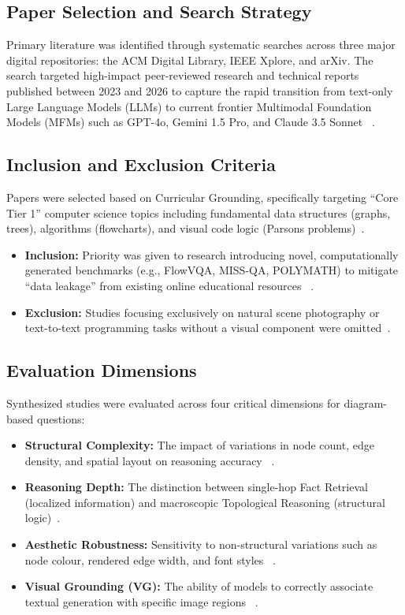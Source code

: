 \documentclass[sigconf, nonacm]{acmart}
\begin{document}
\subsection{Paper Selection and Search Strategy}
Primary literature was identified through systematic searches across three major 
digital repositories: the ACM Digital Library, IEEE Xplore, and arXiv. 
The search targeted high-impact peer-reviewed research and technical reports 
published between 2023 and 2026 to capture the rapid transition from text-only 
Large Language Models (LLMs) to current frontier Multimodal Foundation Models 
(MFMs) such as GPT-4o, Gemini 1.5 Pro, and Claude 3.5 Sonnet~%
\cite{gutierrez2024seeing, hou2024more, gupta2024polymath}.

\subsection{Inclusion and Exclusion Criteria}
Papers were selected based on Curricular Grounding, specifically targeting 
``Core Tier 1'' computer science topics including fundamental data structures 
(graphs, trees), algorithms (flowcharts), and visual code logic 
(Parsons problems)~\cite{gutierrez2024seeing, hou2024more, singh2024flowvqa}.
\begin{itemize}
    \item \textbf{Inclusion:} Priority was given to research introducing novel, 
    computationally generated benchmarks (e.g., FlowVQA, MISS-QA, POLYMATH) 
    to mitigate ``data leakage'' from existing online educational resources~%
    \cite{singh2024flowvqa, gupta2024polymath, zhao2025missqa}.
    \item \textbf{Exclusion:} Studies focusing exclusively on natural scene 
    photography or text-to-text programming tasks without a visual component 
    were omitted~\cite{denny2023conversing}.
\end{itemize}

\subsection{Evaluation Dimensions}
Synthesized studies were evaluated across four critical dimensions for 
diagram-based questions:
\begin{itemize}
    \item \textbf{Structural Complexity:} The impact of variations in node count, 
    edge density, and spatial layout on reasoning accuracy~%
    \cite{singh2024flowvqa, gutierrez2024seeing}.
    \item \textbf{Reasoning Depth:} The distinction between single-hop Fact 
    Retrieval (localized information) and macroscopic Topological Reasoning 
    (structural logic)~\cite{singh2024flowvqa, chen2024m3cot}.
    \item \textbf{Aesthetic Robustness:} Sensitivity to non-structural variations 
    such as node colour, rendered edge width, and font styles~%
    \cite{gutierrez2024seeing, hou2024more}.
    \item \textbf{Visual Grounding (VG):} The ability of models to correctly 
    associate textual generation with specific image regions~%
    \cite{ramachandran2025how, lu2025rsvp}.
\end{itemize}
\end{document}
